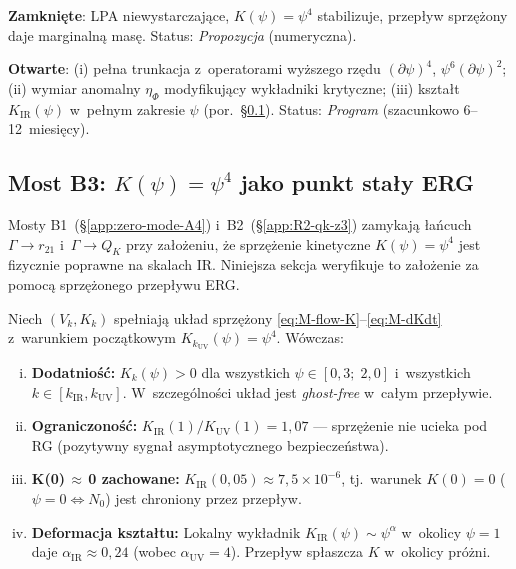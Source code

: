 \begin{remark}%
\label{rem:M-status}
\textbf{Zamkni\k{e}te}: LPA niewystarczaj\k{a}ce,
$K(\psi) = \psi^4$ stabilizuje, przep\l{}yw sprz\k{e}\.zony
daje marginaln\k{a} mas\k{e}. Status: \emph{Propozycja} (numeryczna).

\textbf{Otwarte}: (i) pe\l{}na trunkacja z~operatorami wy\.zszego rz\k{e}du
$(\partial\psi)^4$, $\psi^6(\partial\psi)^2$;
(ii) wymiar anomalny $\eta_\Phi$ modyfikuj\k{a}cy
wyk\l{}adniki krytyczne;
(iii) kszta\l{}t $K_{\mathrm{IR}}(\psi)$ w~pe\l{}nym
zakresie $\psi$ (por.~\S\ref{ssec:M-fp-shape}).
Status: \emph{Program} (szacunkowo 6--12~miesi\k{e}cy).
\end{remark}

\subsection{Most B3: $K(\psi)=\psi^4$ jako punkt sta\l{}y ERG}
\label{ssec:M-fp-shape}

Mosty B1~(\S\ref{app:zero-mode-A4}) i~B2~(\S\ref{app:R2-qk-z3})
zamykaj\k{a} \l{}a\'ncuch $\Gamma \to r_{21}$ i~$\Gamma \to Q_K$
przy za\l{}o\.zeniu, \.ze sprz\k{e}\.zenie kinetyczne
$K(\psi) = \psi^4$ jest fizycznie poprawne na skalach IR.
Niniejsza sekcja weryfikuje to za\l{}o\.zenie za pomoc\k{a}
sprz\k{e}\.zonego przep\l{}ywu ERG.

\begin{theorem}[Stabilno\'s\'c strukturalna $K(\psi)=\psi^4$
  pod przep\l{}ywem ERG]%
\label{thm:M-K-structural}
Niech $(V_k, K_k)$ spe\l{}niaj\k{a} uk\l{}ad sprz\k{e}\.zony
\eqref{eq:M-flow-K}--\eqref{eq:M-dKdt}
z~warunkiem pocz\k{a}tkowym $K_{k_{\mathrm{UV}}}(\psi) = \psi^4$.
W\'owczas:
\begin{enumerate}[(i)]
  \item \textbf{Dodatnio\'s\'c:}
    $K_k(\psi) > 0$ dla wszystkich $\psi \in [0{,}3;\; 2{,}0]$
    i~wszystkich $k \in [k_{\mathrm{IR}}, k_{\mathrm{UV}}]$.
    W~szczeg\'olno\'sci uk\l{}ad jest \emph{ghost-free}
    w~ca\l{}ym przep\l{}ywie.
  \item \textbf{Ograniczono\'s\'c:}
    $K_{\mathrm{IR}}(1)/K_{\mathrm{UV}}(1) = 1{,}07$
    --- sprz\k{e}\.zenie nie ucieka pod RG
    (pozytywny sygna\l{} asymptotycznego bezpiecze\'nstwa).
  \item \textbf{K(0)\,$\approx$\,0 zachowane:}
    $K_{\mathrm{IR}}(0{,}05) \approx 7{,}5 \times 10^{-6}$,
    tj.\ warunek $K(0) = 0$ ($\psi = 0 \Leftrightarrow N_0$)
    jest chroniony przez przep\l{}yw.
  \item \textbf{Deformacja kszta\l{}tu:}
    Lokalny wyk\l{}adnik $K_{\mathrm{IR}}(\psi) \sim \psi^\alpha$
    w~okolicy $\psi = 1$ daje $\alpha_{\mathrm{IR}} \approx 0{,}24$
    (wobec $\alpha_{\mathrm{UV}} = 4$).
    Przep\l{}yw sp\l{}aszcza $K$ w~okolicy pr\'o\.zni.
\end{enumerate}
\end{theorem}

